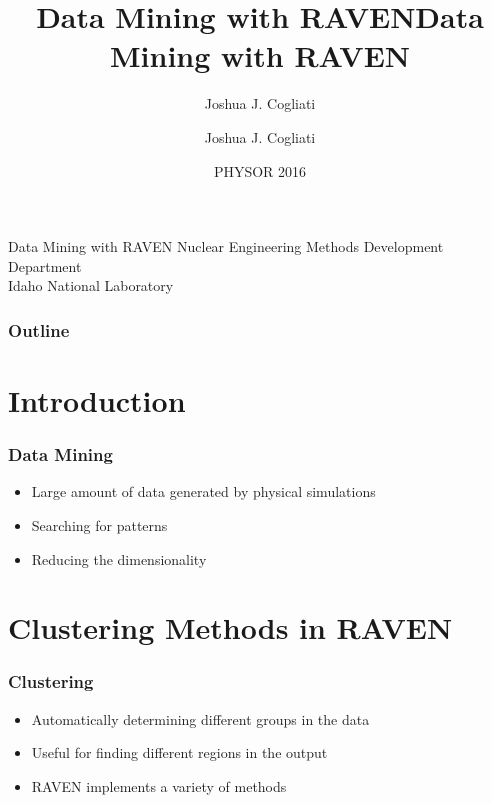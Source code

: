 \documentclass[t,9pt,svgnames]{beamer}
\title{Data Mining with RAVEN}
\author{Joshua J. Cogliati}
\date{PHYSOR 2016}
\begin{document}
\lstset{language=XML}

\title[Data Mining]{Data Mining with RAVEN}
\subtitle{Joshua J. Cogliati}


\begin{titleframe}{Data Mining with RAVEN}
  \vfill
      {\small 
Nuclear Engineering Methods Development Department\\
Idaho National Laboratory}
\end{titleframe}

\begin{frame}
\frametitle{Outline}
\tableofcontents
\end{frame}

\section{Introduction}

\begin{frame}
  \frametitle{Data Mining}
  \begin{itemize}
  \item Large amount of data generated by physical simulations
  \item Searching for patterns
  \item Reducing the dimensionality
  \end{itemize}
\end{frame}

\section{Clustering Methods in RAVEN}

\begin{frame}
  \frametitle{Clustering}
  \begin{itemize}
  \item Automatically determining different groups in the data
  \item Useful for finding different regions in the output
  \item RAVEN implements a variety of methods
  \end{itemize}
\end{frame}
\end{document}
